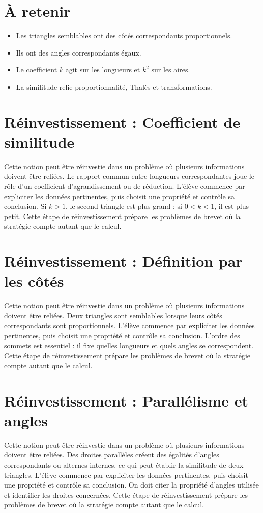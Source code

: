\section{À retenir}
\begin{aretenir}
\begin{itemize}
\item Les triangles semblables ont des côtés correspondants proportionnels.
\item Ils ont des angles correspondants égaux.
\item Le coefficient $k$ agit sur les longueurs et $k^2$ sur les aires.
\item La similitude relie proportionnalité, Thalès et transformations.
\end{itemize}
\end{aretenir}

\section{Réinvestissement : Coefficient de similitude}
Cette notion peut être réinvestie dans un problème où plusieurs informations doivent être reliées. Le rapport commun entre longueurs correspondantes joue le rôle d’un coefficient d’agrandissement ou de réduction. L’élève commence par expliciter les données pertinentes, puis choisit une propriété et contrôle sa conclusion. Si $k>1$, le second triangle est plus grand ; si $0<k<1$, il est plus petit. Cette étape de réinvestissement prépare les problèmes de brevet où la stratégie compte autant que le calcul.

\section{Réinvestissement : Définition par les côtés}
Cette notion peut être réinvestie dans un problème où plusieurs informations doivent être reliées. Deux triangles sont semblables lorsque leurs côtés correspondants sont proportionnels. L’élève commence par expliciter les données pertinentes, puis choisit une propriété et contrôle sa conclusion. L’ordre des sommets est essentiel : il fixe quelles longueurs et quels angles se correspondent. Cette étape de réinvestissement prépare les problèmes de brevet où la stratégie compte autant que le calcul.

\section{Réinvestissement : Parallélisme et angles}
Cette notion peut être réinvestie dans un problème où plusieurs informations doivent être reliées. Des droites parallèles créent des égalités d’angles correspondants ou alternes-internes, ce qui peut établir la similitude de deux triangles. L’élève commence par expliciter les données pertinentes, puis choisit une propriété et contrôle sa conclusion. On doit citer la propriété d’angles utilisée et identifier les droites concernées. Cette étape de réinvestissement prépare les problèmes de brevet où la stratégie compte autant que le calcul.
